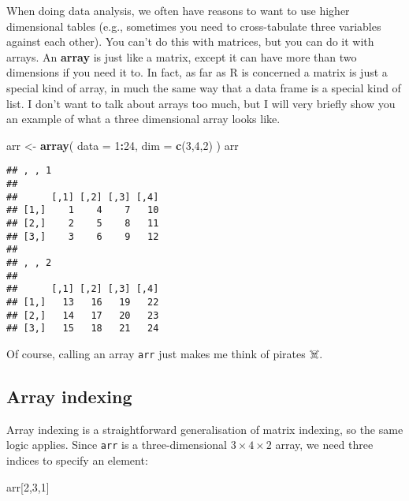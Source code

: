 \documentclass[]{book}
\newenvironment{Shaded}{\begin{snugshade}}{\end{snugshade}}
\newcommand{\DataTypeTok}[1]{\textcolor[rgb]{0.13,0.29,0.53}{#1}}
\newcommand{\DecValTok}[1]{\textcolor[rgb]{0.00,0.00,0.81}{#1}}
\newcommand{\KeywordTok}[1]{\textcolor[rgb]{0.13,0.29,0.53}{\textbf{#1}}}
\newcommand{\NormalTok}[1]{#1}
\newcommand{\OperatorTok}[1]{\textcolor[rgb]{0.81,0.36,0.00}{\textbf{#1}}}
\newcommand{\StringTok}[1]{\textcolor[rgb]{0.31,0.60,0.02}{#1}}
\begin{document}
When doing data analysis, we often have reasons to want to use higher dimensional tables (e.g., sometimes you need to cross-tabulate three variables against each other). You can't do this with matrices, but you can do it with arrays. An \textbf{array} is just like a matrix, except it can have more than two dimensions if you need it to. In fact, as far as R is concerned a matrix is just a special kind of array, in much the same way that a data frame is a special kind of list. I don't want to talk about arrays too much, but I will very briefly show you an example of what a three dimensional array looks like.

\begin{Shaded}
\begin{Highlighting}[]
\NormalTok{arr <-}\StringTok{ }\KeywordTok{array}\NormalTok{(}
  \DataTypeTok{data =} \DecValTok{1}\OperatorTok{:}\DecValTok{24}\NormalTok{, }
  \DataTypeTok{dim =} \KeywordTok{c}\NormalTok{(}\DecValTok{3}\NormalTok{,}\DecValTok{4}\NormalTok{,}\DecValTok{2}\NormalTok{)}
\NormalTok{  )}
\NormalTok{arr}
\end{Highlighting}
\end{Shaded}

\begin{verbatim}
## , , 1
## 
##      [,1] [,2] [,3] [,4]
## [1,]    1    4    7   10
## [2,]    2    5    8   11
## [3,]    3    6    9   12
## 
## , , 2
## 
##      [,1] [,2] [,3] [,4]
## [1,]   13   16   19   22
## [2,]   14   17   20   23
## [3,]   15   18   21   24
\end{verbatim}

Of course, calling an array \texttt{arr} just makes me think of pirates ☠️.

\hypertarget{array-indexing}{%
\subsection{Array indexing}\label{array-indexing}}

Array indexing is a straightforward generalisation of matrix indexing, so the same logic applies. Since \texttt{arr} is a three-dimensional \(3 \times 4 \times 2\) array, we need three indices to specify an element:

\begin{Shaded}
\begin{Highlighting}[]
\NormalTok{arr[}\DecValTok{2}\NormalTok{,}\DecValTok{3}\NormalTok{,}\DecValTok{1}\NormalTok{]}
\end{Highlighting}
\end{Shaded}
\end{document}
